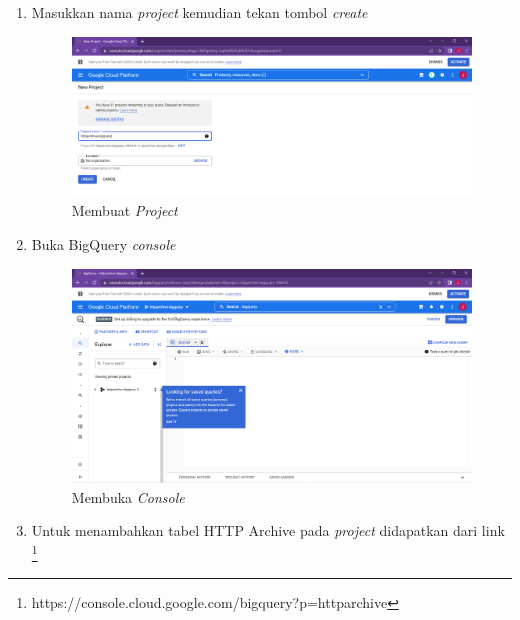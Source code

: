 \begin{enumerate}
	\item Masukkan nama \textit{project} kemudian tekan tombol \textit{create}
	\begin{figure}[H]
		\centering  
		\includegraphics[scale=0.45]{Gambar/create_project.PNG}  
		\caption{Membuat \textit{Project}} 
		\label{fig:create_project} 
	\end{figure}
	
	\item Buka BigQuery \textit{console} 
	\begin{figure}[H]
		\centering  
		\includegraphics[scale=0.35]{Gambar/bq_workspace.PNG}  
		\caption{Membuka \textit{Console}} 
		\label{fig:open_console} 
	\end{figure}
	
	\item Untuk menambahkan tabel HTTP Archive pada \textit{project} didapatkan dari link \footnote{https://console.cloud.google.com/bigquery?p=httparchive}
	

\end{enumerate}
